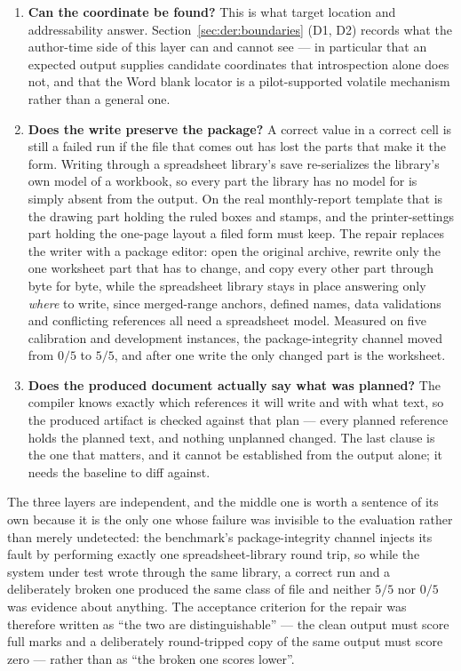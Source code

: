 \begin{enumerate}
  \item \textbf{Can the coordinate be found?} This is what target location and addressability
    answer. Section~\ref{sec:der:boundaries} (D1, D2) records what the author-time side of this
    layer can and cannot see --- in particular that an expected output supplies candidate
    coordinates that introspection alone does not, and that the Word blank locator is a
    pilot-supported volatile mechanism rather than a general one.
  \item \textbf{Does the write preserve the package?} A correct value in a correct cell is
    still a failed run if the file that comes out has lost the parts that make it the form.
    Writing through a spreadsheet library's save re-serializes the library's own model of a
    workbook, so every part the library has no model for is simply absent from the output. On
    the real monthly-report template that is the drawing part holding the ruled boxes and
    stamps, and the printer-settings part holding the one-page layout a filed form must keep.
    The repair replaces the writer with a package editor: open the original archive, rewrite
    only the one worksheet part that has to change, and copy every other part through byte for
    byte, while the spreadsheet library stays in place answering only \emph{where} to write,
    since merged-range anchors, defined names, data validations and conflicting references all
    need a spreadsheet model. Measured on five calibration and development instances, the
    package-integrity channel moved from $0/5$ to $5/5$, and after one write the only changed
    part is the worksheet.
  \item \textbf{Does the produced document actually say what was planned?} The compiler knows
    exactly which references it will write and with what text, so the produced artifact is
    checked against that plan --- every planned reference holds the planned text, and nothing
    unplanned changed. The last clause is the one that matters, and it cannot be established
    from the output alone; it needs the baseline to diff against.
\end{enumerate}

The three layers are independent, and the middle one is worth a sentence of its own because it
is the only one whose failure was invisible to the evaluation rather than merely undetected:
the benchmark's package-integrity channel injects its fault by performing exactly one
spreadsheet-library round trip, so while the system under test wrote through the same library,
a correct run and a deliberately broken one produced the same class of file and neither $5/5$
nor $0/5$ was evidence about anything. The acceptance criterion for the repair was therefore
written as ``the two are distinguishable'' --- the clean output must score full marks and a
deliberately round-tripped copy of the same output must score zero --- rather than as ``the
broken one scores lower''.

